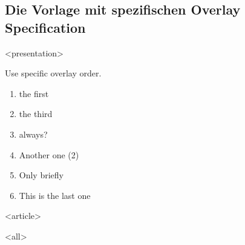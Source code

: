 \subsection{Die Vorlage mit spezifischen Overlay Specification}
{%
\begin{frame}[fragile,t]



\mode
<presentation>

	Use specific overlay order.

		\begin{enumerate}
			\item <1->  the first
			\item <3->  the third
			\item <4-5> always?
			\item <2->  Another one (2)
			\item <3-4> Only briefly
			\item <6->   This is the last one
		\end{enumerate}

\mode
<article>

\mode
<all>

\end{frame}
}

\newpage
